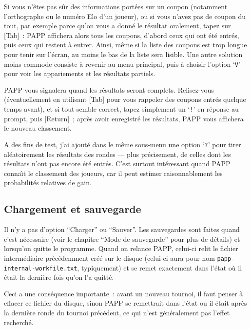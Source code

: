 \documentclass[10pt]{article}
\begin{document}
Si vous n'\^etes pas s\^ur des informations port\'ees sur un coupon 
(notamment l'orthographe ou le num\'ero Elo d'un joueur), ou si vous 
n'avez pas de coupon du tout, par exemple parce qu'on vous a donn\'e 
le r\'esultat oralement, tapez sur [Tab]~: PAPP affichera alors tous 
les coupons, d'abord ceux qui ont \'et\'e entr\'es, puis ceux qui 
restent \`a entrer.  Ainsi, m\^eme si la liste des coupons est trop 
longue pour tenir sur l'\'ecran, au moins le bas de la liste sera 
lisible.  Une autre solution moins commode consiste \`a revenir au 
menu principal, puis \`a choisir l'option `\verb|V|' pour voir les 
appariements et les r\'esultats partiels.

	PAPP vous signalera quand les r\'esultats seront complets.
Relisez-vous (\'eventuellement en utilisant [Tab] pour vous rappeler des
coupons entr\'es quelque temps avant), et si tout semble correct, tapez
simplement un `\verb|!|' en r\'eponse au prompt, puis [Return]~; apr\`es
avoir enregistr\'e les r\'esultats, PAPP vous affichera le nouveau
classement. 

	A des fins de test, j'ai ajout\'e dans le m\^eme sous-menu une
option `\verb|?|' pour tirer al\'eatoirement les r\'esultats des rondes
--- plus pr\'ecisement, de celles dont les r\'esultats n'ont pas encore
\'et\'e entr\'es.  C'est surtout int\'eressant quand PAPP conna{\^\i}t
le classement des joueurs, car il peut estimer raisonnablement les
probabilit\'es relatives de gain.

\subsection{Chargement et sauvegarde} \label{inter}

	Il n'y a pas d'option ``Charger'' ou ``Sauver''.  Les
sauvegardes sont faites quand c'est n\'ecessaire (voir le chapitre
``Mode de sauvegarde'' pour plus de d\'etails) et lorsqu'on quitte le
programme.  Quand on relance PAPP, celui-ci relit le fichier
interm\'ediaire pr\'ec\'edemment cr\'e\'e sur le disque (celui-ci
aura pour nom \verb|papp-internal-workfile.txt|, typiquement) et se remet exactement
dans l'\'etat o\`u il \'etait la derni\`ere fois qu'on l'a quitt\'e.

	Ceci a une cons\'equence importante~: avant un nouveau tournoi,
il faut penser \`a effacer ce fichier du disque, sinon PAPP se remettrait
dans l'\'etat ou il \'etait apr\`es la derni\`ere ronde du tournoi
pr\'ec\'edent, ce qui n'est g\'en\'eralement pas l'effet recherch\'e.
\end{document}
